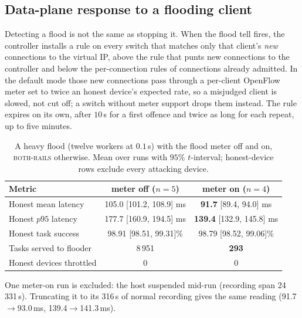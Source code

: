 \documentclass[10pt,twocolumn,letterpaper]{article}
\newcommand{\armfull}{\textsc{both-rails}}
\begin{document}
\subsection{Data-plane response to a flooding client}
\label{sec:res:flood}

Detecting a flood is not the same as stopping it. When the flood tell fires,
the controller installs a rule on every switch that matches only that client's
\emph{new} connections to the virtual IP, above the rule that punts new
connections to the controller and below the per-connection rules of
connections already admitted. In the default mode those new connections pass
through a per-client OpenFlow meter set to twice an honest device's expected
rate, so a misjudged client is slowed, not cut off; a switch without meter
support drops them instead. The rule expires on its own, after $10$\,s for a
first offence and twice as long for each repeat, up to five minutes.

\begin{table}[t]
\caption{A heavy flood (twelve workers at $0.1$\,s) with the flood meter off and
on, \armfull{} otherwise. Mean over runs with $95\%$ $t$-interval; honest-device
rows exclude every attacking device.}
\label{tab:flood}
\centering\footnotesize
\setlength{\tabcolsep}{3pt}
\begin{tabular}{@{}lcc@{}}
\toprule
\textbf{Metric} & \textbf{meter off} ($n{=}5$) & \textbf{meter on} ($n{=}4$)\\
\midrule
Honest mean latency & 105.0 [101.2, 108.9] ms & \textbf{91.7} [89.4, 94.0] ms\\
Honest $p95$ latency & 177.7 [160.9, 194.5] ms & \textbf{139.4} [132.9, 145.8] ms\\
Honest task success & 98.91 [98.51, 99.31]\% & 98.79 [98.52, 99.06]\%\\
Tasks served to flooder & 8\,951 & \textbf{293}\\
Honest devices throttled & 0 & 0\\
\bottomrule
\end{tabular}

\vspace{3pt}
\begin{minipage}{\columnwidth}\scriptsize\raggedright
One meter-on run is excluded: the host suspended mid-run (recording span
24\,331\,s). Truncating it to its 316\,s of normal recording gives the same
reading (91.7$\to$93.0\,ms, 139.4$\to$141.3\,ms).
\end{minipage}
\end{table}
\end{document}
